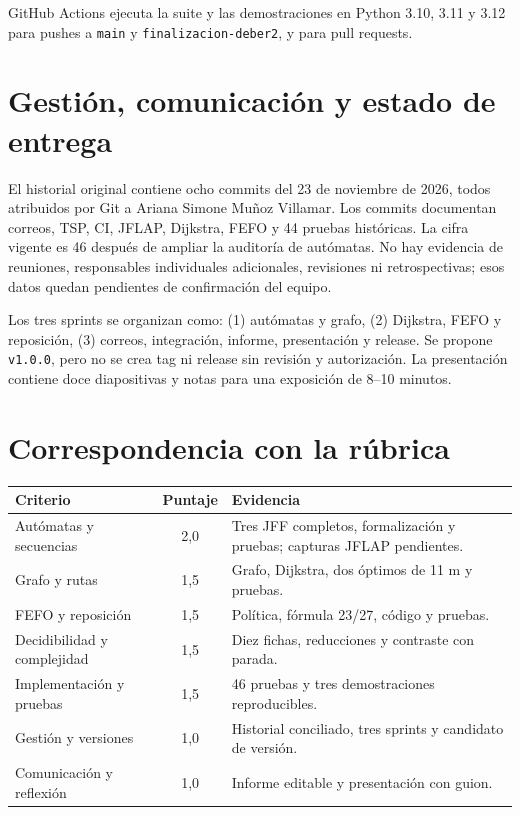 \documentclass[11pt,a4paper]{article}
\newcommand{\code}[1]{\texttt{#1}}
\begin{document}
GitHub Actions ejecuta la suite y las demostraciones en Python 3.10, 3.11 y 3.12 para pushes a \code{main} y \code{finalizacion-deber2}, y para pull requests.

\section{Gestión, comunicación y estado de entrega}

El historial original contiene ocho commits del 23 de noviembre de 2026, todos atribuidos por Git a Ariana Simone Muñoz Villamar. Los commits documentan correos, TSP, CI, JFLAP, Dijkstra, FEFO y 44 pruebas históricas. La cifra vigente es 46 después de ampliar la auditoría de autómatas. No hay evidencia de reuniones, responsables individuales adicionales, revisiones ni retrospectivas; esos datos quedan pendientes de confirmación del equipo.

Los tres sprints se organizan como: (1) autómatas y grafo, (2) Dijkstra, FEFO y reposición, (3) correos, integración, informe, presentación y release. Se propone \code{v1.0.0}, pero no se crea tag ni release sin revisión y autorización. La presentación contiene doce diapositivas y notas para una exposición de 8--10 minutos.

\section{Correspondencia con la rúbrica}

\begin{tabularx}{\textwidth}{@{}XcX@{}}
\toprule
Criterio & Puntaje & Evidencia \\ \midrule
Autómatas y secuencias & 2,0 & Tres JFF completos, formalización y pruebas; capturas JFLAP pendientes.\\
Grafo y rutas & 1,5 & Grafo, Dijkstra, dos óptimos de 11 m y pruebas.\\
FEFO y reposición & 1,5 & Política, fórmula 23/27, código y pruebas.\\
Decidibilidad y complejidad & 1,5 & Diez fichas, reducciones y contraste con parada.\\
Implementación y pruebas & 1,5 & 46 pruebas y tres demostraciones reproducibles.\\
Gestión y versiones & 1,0 & Historial conciliado, tres sprints y candidato de versión.\\
Comunicación y reflexión & 1,0 & Informe editable y presentación con guion.\\
\bottomrule
\end{tabularx}
\end{document}
